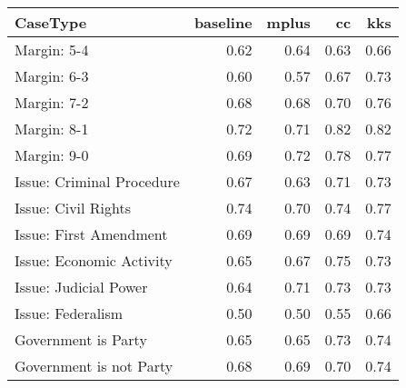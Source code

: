 \begin{table}[ht]
\centering
\begin{tabular}{lrrrr}
  \hline
CaseType & baseline & mplus & cc & kks \\ 
  \hline
Margin: 5-4 & 0.62 & 0.64 & 0.63 & 0.66 \\ 
  Margin: 6-3 & 0.60 & 0.57 & 0.67 & 0.73 \\ 
  Margin: 7-2 & 0.68 & 0.68 & 0.70 & 0.76 \\ 
  Margin: 8-1 & 0.72 & 0.71 & 0.82 & 0.82 \\ 
  Margin: 9-0 & 0.69 & 0.72 & 0.78 & 0.77 \\ 
  Issue: Criminal Procedure & 0.67 & 0.63 & 0.71 & 0.73 \\ 
  Issue: Civil Rights & 0.74 & 0.70 & 0.74 & 0.77 \\ 
  Issue: First Amendment & 0.69 & 0.69 & 0.69 & 0.74 \\ 
  Issue: Economic Activity & 0.65 & 0.67 & 0.75 & 0.73 \\ 
  Issue: Judicial Power & 0.64 & 0.71 & 0.73 & 0.73 \\ 
  Issue: Federalism & 0.50 & 0.50 & 0.55 & 0.66 \\ 
  Government is Party & 0.65 & 0.65 & 0.73 & 0.74 \\ 
  Government is not Party & 0.68 & 0.69 & 0.70 & 0.74 \\ 
   \hline
\end{tabular}
\end{table}
